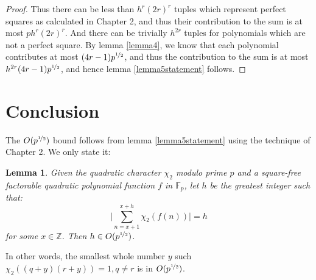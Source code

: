 \documentclass{report}
\newtheorem*{lemma*}{Lemma}
\begin{document}
\begin{proof}
Thus there can be less than $h^r(2r)^r$ tuples which represent perfect squares as calculated in Chapter 2, and thus their contribution to the sum is at most $ph^r(2r)^r$. And there can be trivially $h^{2r}$ tuples for polynomials which are not a perfect square. By lemma \ref{lemma4}, we know that each polynomial contributes at most $(4r-1)p^{\nicefrac{1}{2}}$, and thus the contribution to the sum is at most $h^{2r}(4r-1)p^{\nicefrac{1}{2}}$, and hence lemma \ref{lemma5statement} follows.
%
\begin{comment}
A factor will occur in an even power when each multiplicative term in the expanded representation (each term has a power of exactly 1) $(x+a+m_1)(x+b+m_1) (x+a+m_2)(x+b+m_2) ...(x+a+m_{2r}) (x+b+m_{2r})$ can be paired with another term, such that both terms evaluate to the same linear polynomial when substituted with the $m$ additive term in them. Say a generic pair of terms is $(x+c_i+m_i)$ and $(x+c_j+m_j)$, where $c_i$ and $c_j$ each stand for whichever of $a$ or $b$ occurs in the respective paired term. The pair can occur in two ways:
\begin{itemize}
    \item $c_i=c_j$ and thus $m_i=m_j$, i.e. $(x+a+m_i)=(x+a+m_j)$ or $(x+b+m_i)=(x+b+m_j)$
    \item $c_i\neq c_j$, and thus $(x+a+m_i)=(x+b+m_j)$ or $(x+b+m_i)=(x+a+m_j)$
\end{itemize}

add factorable means completely factorable in intro
\end{comment}
\end{proof}
%
%
\section{Conclusion}
%
The $O(p^{\nicefrac{1}{2}})$ bound follows from lemma \ref{lemma5statement} using the technique of Chapter 2. We only state it:
\begin{lemma*}
Given the quadratic character $\chi_2$ modulo prime $p$ and a square-free factorable quadratic polynomial function $f$ in $\mathbb{F}_p$, let $h$ be the greatest integer such that:
\[\bigg\lvert\sum\limits_{n=x+1}^{x+h}\chi_2(f(n))\bigg\rvert=h\]
 for some $x\in\mathbb{Z}$. Then $h\in O(p^{\nicefrac{1}{2}})$.
\end{lemma*}
In other words, the smallest whole number $y$ such $\chi_2((q+y)(r+y))=1, q\neq r$ is in $O(p^{\nicefrac{1}{2}})$.
\end{document}
